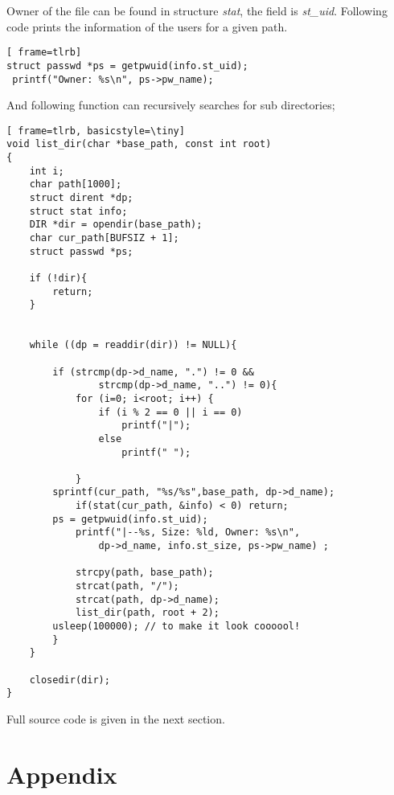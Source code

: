 \documentclass[11pt]{article}
\begin{document}
Owner of the file can be found in structure \textit{stat}, the field is \textit{st\_uid}. Following code prints the information of the users for a given path.

\vspace{5mm}
\begin{minipage}{1\textwidth}
\begin{lstlisting}[ frame=tlrb]
struct passwd *ps = getpwuid(info.st_uid);
 printf("Owner: %s\n", ps->pw_name);
\end{lstlisting}
\end{minipage}

And following function can recursively searches for sub directories;

\vspace{5mm}
\begin{minipage}{1\textwidth}
\begin{lstlisting}[ frame=tlrb, basicstyle=\tiny]
void list_dir(char *base_path, const int root)
{
    int i;
    char path[1000];
    struct dirent *dp;
    struct stat info;
    DIR *dir = opendir(base_path);
    char cur_path[BUFSIZ + 1];
    struct passwd *ps;

    if (!dir){
        return;
    }


    while ((dp = readdir(dir)) != NULL){
    
        if (strcmp(dp->d_name, ".") != 0 && 
        		strcmp(dp->d_name, "..") != 0){
            for (i=0; i<root; i++) {
                if (i % 2 == 0 || i == 0)
                    printf("|");
                else
                    printf(" ");

            }   
        sprintf(cur_path, "%s/%s",base_path, dp->d_name);
            if(stat(cur_path, &info) < 0) return;
        ps = getpwuid(info.st_uid);
            printf("|--%s, Size: %ld, Owner: %s\n", 
            	dp->d_name, info.st_size, ps->pw_name) ;

            strcpy(path, base_path);
            strcat(path, "/");
            strcat(path, dp->d_name);
            list_dir(path, root + 2);
        usleep(100000); // to make it look coooool!
        }
    }

    closedir(dir);
}
\end{lstlisting}
\end{minipage}

Full source code is given in the next section.

\newpage
\section*{Appendix}
\end{document}
